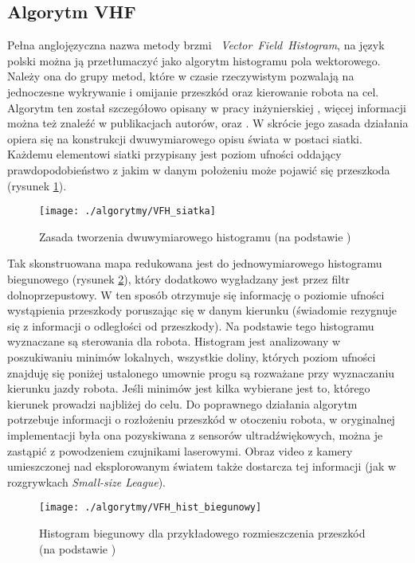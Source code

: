 \subsection{Algorytm VHF}
	Pełna  anglojęzyczna nazwa metody brzmi \mbox{ \emph{Vector Field Histogram}}, na język polski można ją
	przetłumaczyć jako algorytm histogramu pola wektorowego. Należy ona do grupy metod, które w czasie
	rzeczywistym pozwalają na jednoczesne wykrywanie i omijanie przeszkód oraz kierowanie robota na cel.
	Algorytm ten został szczegółowo opisany w pracy inżynierskiej \cite{inzynierka}, więcej informacji można też znaleźć w publikacjach autorów, \cite{VFH_1} oraz \cite{VFH_2}.
	W skrócie jego zasada działania opiera się na konstrukcji dwuwymiarowego opisu świata w postaci siatki. Każdemu elementowi siatki przypisany jest poziom ufności oddający prawdopodobieństwo
	z jakim w danym położeniu może pojawić się przeszkoda (rysunek \ref{fig:VFH_siatka}).
	\begin{figure}[H]
	\centering
	\texttt{[image: ./algorytmy/VFH\_siatka]}
	\caption{ Zasada tworzenia dwuwymiarowego histogramu \newline(na podstawie \cite{VFH_2})}\label{fig:VFH_siatka}
	\end{figure}
	Tak skonstruowana mapa redukowana jest do jednowymiarowego histogramu biegunowego (rysunek \ref{fig:VFH_hist_biegunowy}), który dodatkowo wygładzany jest przez
	filtr dolnoprzepustowy. W ten sposób otrzymuje się informację o poziomie ufności wystąpienia przeszkody poruszając się w danym kierunku (świadomie rezygnuje się z informacji o odległości od przeszkody).
	Na podstawie tego histogramu wyznaczane są sterowania dla robota. Histogram jest analizowany w poszukiwaniu minimów lokalnych, wszystkie doliny, których poziom ufności
	znajduję się poniżej ustalonego umownie progu są rozważane przy wyznaczaniu kierunku jazdy robota. Jeśli minimów jest kilka wybierane jest to, którego kierunek prowadzi najbliżej
	do celu. 
	Do poprawnego działania algorytm potrzebuje informacji o rozłożeniu przeszkód w otoczeniu robota, w oryginalnej implementacji była ona pozyskiwana z sensorów ultradźwiękowych,
	można je zastąpić z powodzeniem czujnikami laserowymi. Obraz video z kamery umieszczonej nad eksplorowanym światem także dostarcza tej informacji (jak w rozgrywkach \emph{Small-size League}).
	\begin{figure}[H]
	\centering
	\texttt{[image: ./algorytmy/VFH\_hist\_biegunowy]}
	\caption{ Histogram biegunowy dla przykładowego rozmieszczenia przeszkód \newline(na podstawie \cite{ISR})}\label{fig:VFH_hist_biegunowy}
	\end{figure}

